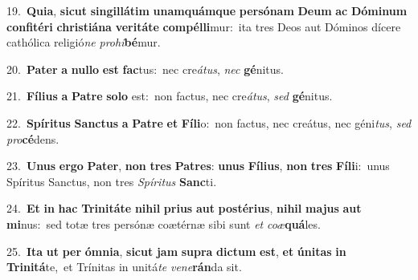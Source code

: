 {{\numbfont\textcolor{\numbcolor}{19.}}~\-\textbf{Qui}\-\textbf{a}, \textbf{sic}\-\textbf{ut} \textbf{sin}\-\textbf{gil}\textbf{lá}\textbf{tim} \textbf{u}\-\textbf{nam}\textbf{quám}\textbf{que} \textbf{per}\-\textbf{só}\textbf{nam} \textbf{De}\-\textbf{um} \textbf{ac} \textbf{Dó}\-\textbf{mi}\textbf{num} \textbf{con}\-\textbf{fi}\textbf{té}\textbf{ri} \textbf{chris}\-\textbf{ti}\textbf{á}\textbf{na} \textbf{ve}\-\textbf{ri}\textbf{tá}\textbf{te} \textbf{com}\-\textbf{pél}\textbf{li}mur:~\star ita tres Deos aut Dóminos dícere cathólica religió\textit{ne} \textit{pro}\-\textit{hi}\textbf{bé}mur.\par
{\numbfont\textcolor{\numbcolor}{20.}}~\-\textbf{Pa}\-\textbf{ter} \textbf{a} \textbf{nul}\-\textbf{lo} \textbf{est} \textbf{fac}\-tus:~\star nec cre\-\textit{á}\-\textit{tus}, \textit{nec} \textbf{gé}\-nitus.\par
{\numbfont\textcolor{\numbcolor}{21.}}~\-\textbf{Fí}\-\textbf{li}\textbf{us} \textbf{a} \textbf{Pa}\-\textbf{tre} \textbf{so}\-\textbf{lo} est:~\star non factus, nec cre\-\textit{á}\-\textit{tus}, \textit{sed} \textbf{gé}\-nitus.\par
{\numbfont\textcolor{\numbcolor}{22.}}~\-\textbf{Spí}\-\textbf{ri}\textbf{tus} \textbf{Sanc}\-\textbf{tus} \textbf{a} \textbf{Pa}\-\textbf{tre} \textbf{et} \textbf{Fí}\-\textbf{li}o:~\star non factus, nec creátus, nec géni\-\textit{tus}\-, \textit{sed} \textit{pro}\-\textbf{cé}dens.\par
{\numbfont\textcolor{\numbcolor}{23.}}~\-\textbf{U}\-\textbf{nus} \textbf{er}\-\textbf{go} \textbf{Pa}\-\textbf{ter}, \textbf{non} \textbf{tres} \textbf{Pa}\-\textbf{tres}: \textbf{u}\-\textbf{nus} \textbf{Fí}\-\textbf{li}\textbf{us}, \textbf{non} \textbf{tres} \textbf{Fí}\-\textbf{li}i:~\star unus Spíritus Sanctus, non tres \textit{Spí}\-\textit{ri}\textit{tus} \textbf{Sanc}\-ti.\par
{\numbfont\textcolor{\numbcolor}{24.}}~\textbf{Et} \textbf{in} \textbf{hac} \textbf{Tri}\-\textbf{ni}\textbf{tá}\textbf{te} \textbf{ni}\-\textbf{hil} \textbf{pri}\-\textbf{us} \textbf{aut} \textbf{post}\-\textbf{é}\textbf{ri}\textbf{us}, \textbf{ni}\-\textbf{hil} \textbf{ma}\-\textbf{jus} \textbf{aut} \textbf{mi}\-nus:~\star sed totæ tres persónæ coætérnæ sibi sunt \textit{et} \textit{co}\-\textit{æ}\textbf{quá}les.\par
{\numbfont\textcolor{\numbcolor}{25.}}~\-\textbf{I}\-\textbf{ta} \textbf{ut} \textbf{per} \textbf{óm}\-\textbf{ni}\textbf{a}, \textbf{sic}\-\textbf{ut} \textbf{jam} \textbf{su}\-\textbf{pra} \textbf{dic}\-\textbf{tum} \textbf{est}\-, \textbf{et} \textbf{ú}\-\textbf{ni}\textbf{tas} \textbf{in} \textbf{Tri}\-\textbf{ni}\textbf{tá}te,~\star et Trínitas in unitá\textit{te} \textit{ve}\-\textit{ne}\textbf{rán}da sit.\par
}

